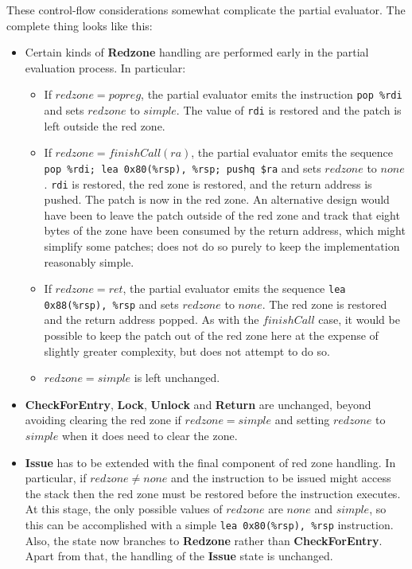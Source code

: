 These control-flow considerations somewhat complicate the partial
evaluator.  The complete thing looks like this:

\begin{itemize}
\item Certain kinds of \textbf{Redzone} handling are performed early
  in the partial evaluation process.  In particular:
  
  \begin{itemize}
  \item If $redzone = popreg$, the partial evaluator emits the
    instruction \verb|pop %rdi| and sets $redzone$ to $simple$.  The
    value of \verb|rdi| is restored and the patch is left outside the
    red zone.
  \item If $redzone = finishCall(ra)$, the partial evaluator emits the
    sequence \verb|pop %rdi; lea 0x80(%rsp), %rsp; pushq $ra| and sets
    $redzone$ to $none$.  \verb|rdi| is restored, the red zone is
    restored, and the return address is pushed.  The patch is now in
    the red zone.  An alternative design would have been to leave the
    patch outside of the red zone and track that eight bytes of the
    zone have been consumed by the return address, which might
    simplify some patches; {\implementation} does not do so purely to
    keep the implementation reasonably simple.
  \item If $redzone = ret$, the partial evaluator emits the sequence
    \verb|lea 0x88(%rsp), %rsp| and sets $redzone$ to $none$.  The red
    zone is restored and the return address popped.  As with the
    $finishCall$ case, it would be possible to keep the patch out of
    the red zone here at the expense of slightly greater complexity,
    but {\implementation} does not attempt to do so.
  \item $redzone = simple$ is left unchanged.
  \end{itemize}
\item \textbf{CheckForEntry}, \textbf{Lock}, \textbf{Unlock} and
  \textbf{Return} are unchanged, beyond avoiding clearing the red zone
  if $redzone = simple$ and setting $redzone$ to $simple$ when it does
  need to clear the zone.
\item \textbf{Issue} has to be extended with the final component of
  red zone handling.  In particular, if $redzone \not= none$ and the
  instruction to be issued might access the stack then the red zone
  must be restored before the instruction executes.  At this stage,
  the only possible values of $redzone$ are $none$ and $simple$, so
  this can be accomplished with a simple \verb|lea 0x80(%rsp), %rsp|
  instruction.  Also, the state now branches to \textbf{Redzone}
  rather than \textbf{CheckForEntry}.  Apart from that, the handling
  of the \textbf{Issue} state is unchanged.
\end{itemize}

